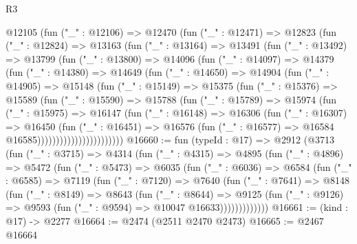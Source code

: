\begin{lexlean}{R3}
\begin{coremodule}
          @12105
            (fun ("_" : @12106) =>
            @12470
              (fun ("_" : @12471) =>
              @12823
                (fun ("_" : @12824) =>
                @13163
                  (fun ("_" : @13164) =>
                  @13491
                    (fun ("_" : @13492) =>
                    @13799
                      (fun ("_" : @13800) =>
                      @14096
                        (fun ("_" : @14097) =>
                        @14379
                          (fun ("_" : @14380) =>
                          @14649
                            (fun ("_" : @14650) =>
                            @14904
                              (fun ("_" : @14905) =>
                              @15148
                                (fun ("_" : @15149) =>
                                @15375
                                  (fun ("_" : @15376) =>
                                  @15589
                                    (fun ("_" : @15590) =>
                                    @15788
                                      (fun ("_" : @15789) =>
                                      @15974
                                        (fun ("_" : @15975) =>
                                        @16147
                                          (fun ("_" : @16148) =>
                                          @16306
                                            (fun ("_" : @16307) =>
                                            @16450
                                              (fun ("_" : @16451) =>
                                              @16576
                                                (fun ("_" : @16577) =>
                                                @16584 @16585)))))))))))))))))))))))
@16660 := fun (typeId : @17) =>
  @2912
    (@3713
      (fun ("_" : @3715) =>
      @4314
        (fun ("_" : @4315) =>
        @4895
          (fun ("_" : @4896) =>
          @5472
            (fun ("_" : @5473) =>
            @6035
              (fun ("_" : @6036) =>
              @6584
                (fun ("_" : @6585) =>
                @7119
                  (fun ("_" : @7120) =>
                  @7640
                    (fun ("_" : @7641) =>
                    @8148
                      (fun ("_" : @8149) =>
                      @8643
                        (fun ("_" : @8644) =>
                        @9125
                          (fun ("_" : @9126) =>
                          @9593 (fun ("_" : @9594) => @10047 @16633)))))))))))))
@16661 := (kind : @17) -> @2277
@16664 := @2474 (@2511 @2470 @2473)
@16665 := @2467 @16664

\end{coremodule}
\end{lexlean}
